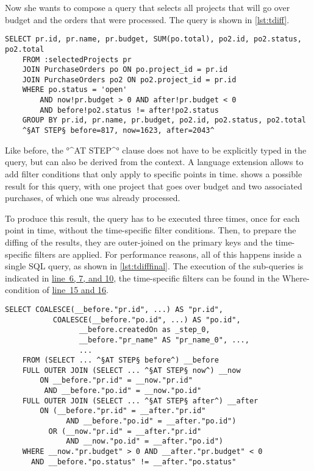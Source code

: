 \documentclass[english]{sig-alternate-05-2015}
\newcommand{\todo}[2][]{\pdfmargincomment[author={#1}]{#2}}
\newcommand{\linerefn}[2]{\hyperref[#1]{line~#2}}
\begin{document}
Now she wants to compose a query that selects all projects that will go over budget and the orders that were processed.
\todo{explain query rewriting}
The query is shown in \cref{lst:tdiff}.
\begin{lstlisting}[language=HanaSQL,float=b,caption={Example of a time-diff query: "Select all projects that will go over budget and their respective purchase orders"},label=lst:tdiff]
	SELECT pr.id, pr.name, pr.budget, SUM(po.total), po2.id, po2.status, po2.total
	FROM :selectedProjects pr
	JOIN PurchaseOrders po ON po.project_id = pr.id
	JOIN PurchaseOrders po2 ON po2.project_id = pr.id
	WHERE po.status = 'open'
		AND now!pr.budget > 0 AND after!pr.budget < 0
		AND before!po2.status != after!po2.status
	GROUP BY pr.id, pr.name, pr.budget, po2.id, po2.status, po2.total
	^§AT STEP§ before=817, now=1623, after=2043^
\end{lstlisting}
Like before, the °^AT STEP^° clause does not have to be explicitly typed in the query, but can also be derived from the context.
A language extension allows to add filter conditions that only apply to specific points in time.
 shows a possible result for this query, with one project that goes over budget and two associated purchases, of which one was already processed.

To produce this result, the query has to be executed three times, once for each point in time, without the time-specific filter conditions.
Then, to prepare the diffing of the results, they are outer-joined on the primary keys and the time-specific filters are applied.
For performance reasons, all of this happens inside a single SQL query, as shown in \cref{lst:tdifffinal}.
The execution of the sub-queries is indicated in \linerefn{lst:tdifffinal}{6, 7, and 10}, the time-specific filters can be found in the Where-condition of \linerefn{lst:tdifffinal}{15 and 16}.

\begin{lstlisting}[language=HanaSQL,float,caption={Parts of the time-diff query after transformation},label=lst:tdifffinal]
	SELECT COALESCE(__before."pr.id", ...) AS "pr.id",
	       COALESCE(__before."po.id", ...) AS "po.id",
				 __before.createdOn as _step_0,
				 __before."pr_name" AS "pr_name_0", ...,
				 ...
	FROM (SELECT ... ^§AT STEP§ before^) __before
	FULL OUTER JOIN (SELECT ... ^§AT STEP§ now^) __now
	    ON __before."pr.id" = __now."pr.id" 
		 AND __before."po.id" = __now."po.id"
	FULL OUTER JOIN (SELECT ... ^§AT STEP§ after^) __after
	    ON (__before."pr.id" = __after."pr.id" 
		      AND __before."po.id" = __after."po.id")
		  OR (__now."pr.id" = __after."pr.id" 
		      AND __now."po.id" = __after."po.id")
	WHERE __now."pr.budget" > 0 AND __after."pr.budget" < 0
	  AND __before."po.status" != __after."po.status"
\end{lstlisting}
\end{document}
